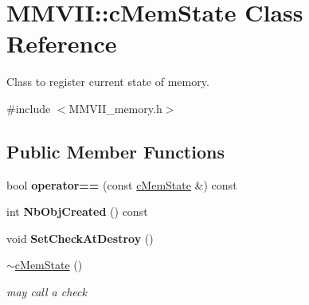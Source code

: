\hypertarget{classMMVII_1_1cMemState}{}\section{M\+M\+V\+II\+:\+:c\+Mem\+State Class Reference}
\label{classMMVII_1_1cMemState}


Class to register current state of memory.  




{\ttfamily \#include $<$M\+M\+V\+I\+I\+\_\+memory.\+h$>$}

\subsection*{Public Member Functions}
\begin{DoxyCompactItemize}
\item 
bool {\bfseries operator==} (const \hyperlink{classMMVII_1_1cMemState}{c\+Mem\+State} \&) const \hypertarget{classMMVII_1_1cMemState_ab923167912942be2e81340d49a084328}{}\label{classMMVII_1_1cMemState_ab923167912942be2e81340d49a084328}

\item 
int {\bfseries Nb\+Obj\+Created} () const \hypertarget{classMMVII_1_1cMemState_a5b37c89bfb4105fac56a3209f12d29df}{}\label{classMMVII_1_1cMemState_a5b37c89bfb4105fac56a3209f12d29df}

\item 
void {\bfseries Set\+Check\+At\+Destroy} ()\hypertarget{classMMVII_1_1cMemState_a5e13bb6a71a383c61fbb306b8e20f1da}{}\label{classMMVII_1_1cMemState_a5e13bb6a71a383c61fbb306b8e20f1da}

\item 
\hyperlink{classMMVII_1_1cMemState_ae4008999ed00727f139f1f1f9fb9c50c}{$\sim$c\+Mem\+State} ()\hypertarget{classMMVII_1_1cMemState_ae4008999ed00727f139f1f1f9fb9c50c}{}\label{classMMVII_1_1cMemState_ae4008999ed00727f139f1f1f9fb9c50c}

\begin{DoxyCompactList}\small\item\em may call a check \end{DoxyCompactList}\end{DoxyCompactItemize}
